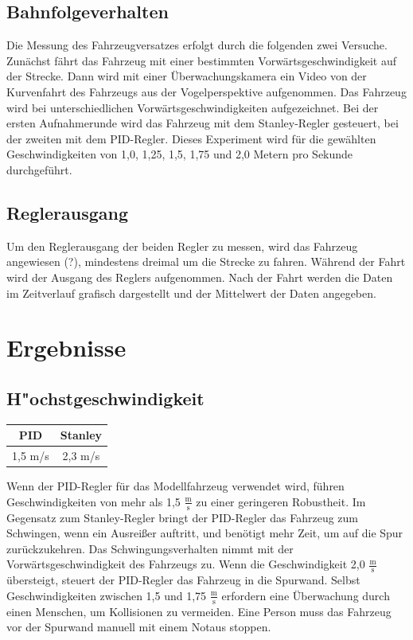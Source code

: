 \documentclass[arbeit=studie,oneside,BCOR=12mm]{ArbeitRST}
\begin{document}
\subsection{Bahnfolgeverhalten}

Die Messung des Fahrzeugversatzes erfolgt durch die folgenden zwei Versuche.
Zunächst fährt das Fahrzeug mit einer bestimmten Vorwärtsgeschwindigkeit auf
der Strecke. Dann wird mit einer Überwachungskamera ein Video von der
Kurvenfahrt des Fahrzeugs aus der Vogelperspektive aufgenommen. Das Fahrzeug
wird bei unterschiedlichen Vorwärtsgeschwindigkeiten aufgezeichnet. Bei der
ersten Aufnahmerunde wird das Fahrzeug mit dem Stanley-Regler gesteuert, bei
der zweiten mit dem PID-Regler. Dieses Experiment wird für die gewählten
Geschwindigkeiten von 1,0, 1,25, 1,5, 1,75 und 2,0 Metern pro Sekunde
durchgeführt.

\subsection{Reglerausgang}

Um den Reglerausgang der beiden Regler zu messen, wird das Fahrzeug angewiesen
(?), mindestens dreimal um die Strecke zu fahren. Während der Fahrt wird der
Ausgang des Reglers aufgenommen. Nach der Fahrt werden die Daten im Zeitverlauf
grafisch dargestellt und der Mittelwert der Daten angegeben. 

\section{Ergebnisse}

\subsection{H"ochstgeschwindigkeit}
\begin{center}
\begin{tabular}{|c|c|}
\hline
    PID & Stanley \\
\hline
\hline
    1,5 m/s & 2,3 m/s \\
\hline
\end{tabular}
\end{center}

Wenn der PID-Regler für das Modellfahrzeug verwendet wird, führen
Geschwindigkeiten von mehr als 1,5 $\frac{\mathrm{m}}{\mathrm{s}}$ zu einer
geringeren Robustheit. Im Gegensatz zum Stanley-Regler bringt der PID-Regler
das Fahrzeug zum Schwingen, wenn ein Ausreißer auftritt, und benötigt mehr
Zeit, um auf die Spur zurückzukehren. Das Schwingungsverhalten nimmt mit der
Vorwärtsgeschwindigkeit des Fahrzeugs zu. Wenn die Geschwindigkeit 2,0
$\frac{\mathrm{m}}{\mathrm{s}}$ übersteigt, steuert der PID-Regler das Fahrzeug
in die Spurwand. Selbst Geschwindigkeiten zwischen 1,5 und 1,75
$\frac{\mathrm{m}}{\mathrm{s}}$ erfordern eine Überwachung durch einen Menschen,
um Kollisionen zu vermeiden. Eine Person muss das Fahrzeug vor der Spurwand manuell mit 
einem Notaus stoppen.
\end{document}
